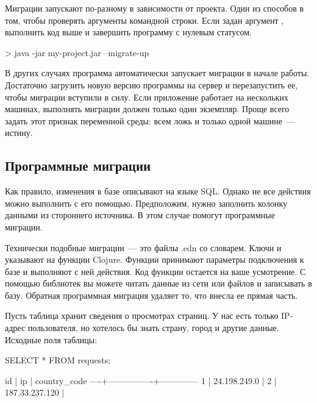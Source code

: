 Миграции запускают по-разному в зависимости от проекта. Один из способов в том, чтобы проверять аргументы командной строки. Если задан аргумент , выполнить код выше и завершить программу с нулевым статусом.

\begin{english}
  \begin{bash}
> java -jar my-project.jar --migrate-up
  \end{bash}
\end{english}

В других случаях программа автоматически запускает миграции в начале работы. Достаточно загрузить новую версию программы на сервер и перезапустить ее, чтобы миграции вступили в силу. Если приложение работает на нескольких машинах, выполнять миграции должен только один экземпляр. Проще всего задать этот признак переменной среды: всем ложь и только одной машине~--- истину.

\subsection{Программные миграции}

Как правило, изменения в базе описывают на языке SQL. Однако не все действия можно выполнить с его помощью. Предположим, нужно заполнить колонку данными из стороннего источника. В этом случае помогут программные миграции.

Технически подобные миграции~--- это файлы .edn со словарем. Ключи  и  указывают на функции Clojure. Функции принимают параметры подключения к базе и выполняют с ней действия. Код функции остается на ваше усмотрение. С помощью библиотек вы можете читать данные из сети или файлов и записывать в базу. Обратная программная миграция удаляет то, что внесла ее прямая часть.

Пусть таблица  хранит сведения о просмотрах страниц. У нас есть только IP-адрес пользователя, но хотелось бы знать страну, город и другие данные. Исходные поля таблицы:

\begin{english}
  \begin{sql}
SELECT * FROM requests;
  \end{sql}
\end{english}

\begin{english}
  \begin{text}
 id |       ip       | country_code
----+----------------+--------------
  1 | 24.198.249.0   |
  2 | 187.33.237.120 |
  \end{text}
\end{english}


